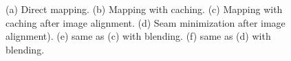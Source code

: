 \message{ !name(paper.tex)}\documentclass[10pt,twocolumn,letterpaper]{article}
\begin{document}
\begin{figure}
  \centering

  \centering

  \centering

  \centering

  \centering

  \centering
  \caption{(a) Direct mapping. (b) Mapping with caching. (c) Mapping
    with caching after image alignment. (d) Seam minimization after
    image alignment). (e) same as (c) with blending. (f) same as (d)
    with blending.}
  \label{fig:compareAll}
\end{figure}
\end{document}
